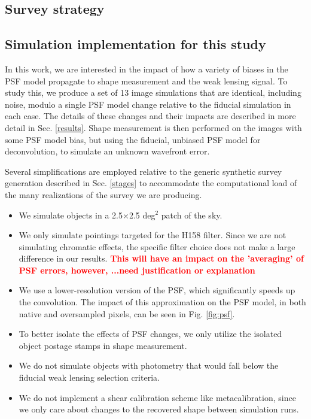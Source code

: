 \documentclass[aps,prd, amsmath,amssymb,superscriptaddress,showkeys,nofootinbib,reprint,preprintnumbers]{revtex4-1}
\newcommand{\verify}[1]{\textcolor{red}{\textbf{{#1}}}}
\newcommand\assign[1]{\todo[color=RoyalPurple!40, inline, size=\small]{Contributing: #1}}
\begin{document}
\subsection{Survey strategy}
\assign{Hirata}

\subsection{Simulation implementation for this study}

In this work, we are interested in the impact of how a variety of biases in the PSF model propagate to shape measurement and the weak lensing signal. 
To study this, we produce a set of 13 image simulations that are identical, including noise, modulo a single PSF model change relative to the fiducial simulation in each case. 
The details of these changes and their impacts are described in more detail in Sec. \ref{results}. 
Shape measurement is then performed on the images with some PSF model bias, but using the fiducial, unbiased PSF model for deconvolution, to simulate an unknown wavefront error.

Several simplifications are employed relative to the generic synthetic survey generation described in Sec. \ref{stages} to accommodate the computational load of the many realizations of the survey we are producing. 
\begin{itemize}
\item We simulate objects in a 2.5$\times$2.5 deg$^2$ patch of the sky.
\item We only simulate pointings targeted for the H158 filter. 
Since we are not simulating chromatic effects, the specific filter choice does not make a large difference in our results. 
\verify{This will have an impact on the 'averaging' of PSF errors, however, ...need justification or explanation} 
\item We use a lower-resolution version of the PSF, which significantly speeds up the convolution.
The impact of this approximation on the PSF model, in both native and oversampled pixels, can be seen in Fig. \ref{fig:psf}. 
\item To better isolate the effects of PSF changes, we only utilize the isolated object postage stamps in shape measurement.
\item We do not simulate objects with photometry that would fall below the fiducial weak lensing selection criteria.
\item We do not implement a shear calibration scheme like metacalibration, since we only care about changes to the recovered shape between simulation runs.
\end{itemize}
\end{document}
